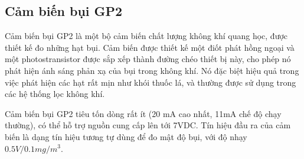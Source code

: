 \subsection{Cảm biến bụi GP2} 
Cảm biến bụi GP2 là một bộ cảm biến chất lượng không khí quang học, được thiết kế đo những hạt bụi. Cảm biến được thiết kế một điốt phát hồng ngoại và một photostransistor được sắp xếp thành đường chéo thiết bị này, cho phép nó phát hiện ánh sáng phản xạ của bụi trong không khí.  Nó đặc biệt hiệu quả trong việc phát hiện các hạt rất mịn như khói thuốc lá, và thường được sử dụng trong các hệ thống lọc không khí.

Cảm biến bụi GP2 tiêu tốn dòng rất ít (20 mA cao nhất, 11mA chế độ chạy thường), có thể hỗ trợ nguồn cung cấp lên tới 7VDC. Tín hiệu đầu ra của cảm biến là dạng tín hiệu tương tự dùng để đo mật độ bụi, với độ nhạy $0.5V/0.1mg/{m}^{3}$.

